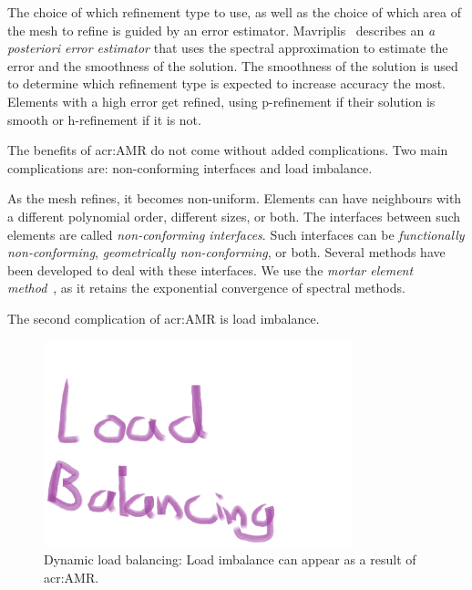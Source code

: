 The choice of which refinement type to use, as well as the choice of which area of the mesh to
refine is guided by an error estimator. Mavriplis~\cite{Mavriplis1990} describes an \textit{a
posteriori error estimator} that uses the spectral approximation to estimate the error and the
smoothness of the solution. The smoothness of the solution is used to determine which refinement
type is expected to increase accuracy the most. Elements with a high error get refined, using
p-refinement if their solution is smooth or h-refinement if it is not.

The benefits of \acrshort{acr:AMR} do not come without added complications. Two main complications
are: non-conforming interfaces and load imbalance.

As the mesh refines, it becomes non-uniform. Elements can have neighbours with a different
polynomial order, different sizes, or both. The interfaces between such elements are called
\textit{non-conforming interfaces}. Such interfaces can be \textit{functionally non-conforming},
\textit{geometrically non-conforming}, or both. Several methods have been developed to deal with
these interfaces. We use the \textit{mortar element method}~\cite{Maday1989}, as it retains the
exponential convergence of spectral methods.


The second complication of \acrshort{acr:AMR} is load imbalance. 

\begin{figure}[H]
	\centering
	\includegraphics[width=0.8\textwidth]{Chapter_introduction/media/dynamic_load_balancing}
	\caption{Dynamic load balancing: Load imbalance can appear as a result of \acrshort{acr:AMR}.}\label{fig:intro_load_balancing}
\end{figure}

